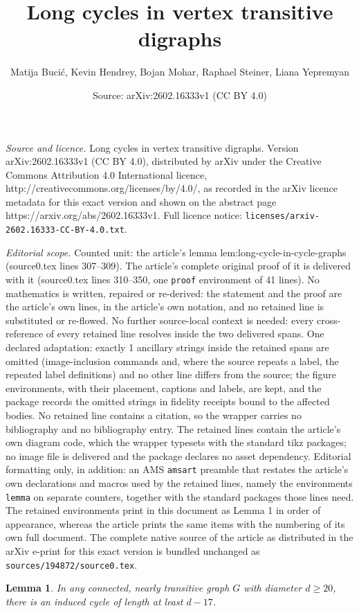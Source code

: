 \documentclass[10pt,a4paper]{amsart}
\title{Long cycles in vertex transitive digraphs}
\author{Matija Buci\'c, Kevin Hendrey, Bojan Mohar, Raphael Steiner, Liana Yepremyan}
\date{Source: arXiv:2602.16333v1 (CC BY 4.0)}
\newtheorem{lemma}{Lemma}
\begin{document}
\maketitle

\noindent\emph{Source and licence.} Long cycles in vertex transitive digraphs. Version arXiv:2602.16333v1 (CC BY 4.0), distributed by arXiv under the Creative Commons Attribution 4.0 International licence, http://creativecommons.org/licenses/by/4.0/, as recorded in the arXiv licence metadata for this exact version and shown on the abstract page https://arxiv.org/abs/2602.16333v1. Full licence notice: \texttt{licenses/arxiv-2602.16333-CC-BY-4.0.txt}.\par\smallskip

\noindent\textit{Editorial scope.} Counted unit: the article's lemma lem:long-cycle-in-cycle-graphs (source0.tex lines 307--309). The article's complete original proof of it is delivered with it (source0.tex lines 310--350, one \texttt{proof} environment of 41 lines). No mathematics is written, repaired or re-derived: the statement and the proof are the article's own lines, in the article's own notation, and no retained line is substituted or re-flowed.  No further source-local context is needed: every cross-reference of every retained line resolves inside the two delivered spans.  One declared adaptation: exactly 1 ancillary strings inside the retained spans are omitted (image-inclusion commands and, where the source repeats a label, the repeated label definitions) and no other line differs from the source; the figure environments, with their placement, captions and labels, are kept, and the package records the omitted strings in fidelity receipts bound to the affected bodies.  No retained line contains a citation, so the wrapper carries no bibliography and no bibliography entry.  The retained lines contain the article's own diagram code, which the wrapper typesets with the standard tikz packages; no image file is delivered and the package declares no asset dependency.  Editorial formatting only, in addition: an AMS \texttt{amsart} preamble that restates the article's own declarations and macros used by the retained lines, namely the environments \texttt{lemma} on separate counters, together with the standard packages those lines need.  The retained environments print in this document as Lemma 1 in order of appearance, whereas the article prints the same items with the numbering of its own full document.  The complete native source of the article as distributed in the arXiv e-print for this exact version is bundled unchanged as \texttt{sources/194872/source0.tex}.
\begin{lemma}\label{lem:long-cycle-in-cycle-graphs}
	In any connected, nearly transitive graph $G$ with diameter $d\ge 20$, there is an induced cycle of length at least $d-17$.
\end{lemma}
\end{document}
